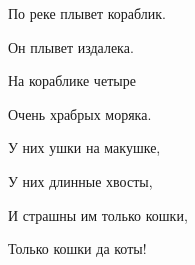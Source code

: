 По реке плывет кораблик. 

Он плывет издалека. 

На кораблике четыре 

Очень храбрых моряка.


\hspace*{4cm} У них ушки на макушке,
 
\hspace*{4cm} У них длинные хвосты, 

\hspace*{4cm} И страшны им только кошки, 

\hspace*{4cm} Только кошки да коты!